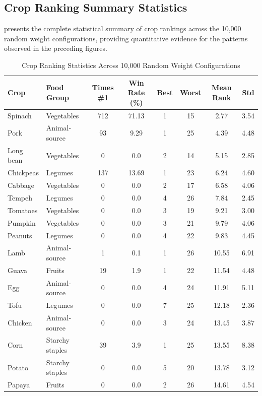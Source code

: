 \documentclass{oqireport}
\begin{document}
\subsection{Crop Ranking Summary Statistics}

 presents the complete statistical summary of crop rankings across the 10,000 random weight configurations, providing quantitative evidence for the patterns observed in the preceding figures.

\begin{table}[H]
\centering
\caption{Crop Ranking Statistics Across 10,000 Random Weight Configurations}
\label{tab:crop_ranking_summary}
\scriptsize
\begin{tabular}{llcccccc}
\toprule
\textbf{Crop} & \textbf{Food Group} & \textbf{Times \#1} & \textbf{Win Rate (\%)} & \textbf{Best} & \textbf{Worst} & \textbf{Mean Rank} & \textbf{Std} \\
\midrule
Spinach & Vegetables & 712 & 71.13 & 1 & 15 & 2.77 & 3.54 \\
Pork & Animal-source & 93 & 9.29 & 1 & 25 & 4.39 & 4.48 \\
Long bean & Vegetables & 0 & 0.0 & 2 & 14 & 5.15 & 2.85 \\
Chickpeas & Legumes & 137 & 13.69 & 1 & 23 & 6.24 & 4.60 \\
Cabbage & Vegetables & 0 & 0.0 & 2 & 17 & 6.58 & 4.06 \\
Tempeh & Legumes & 0 & 0.0 & 4 & 26 & 7.84 & 2.45 \\
Tomatoes & Vegetables & 0 & 0.0 & 3 & 19 & 9.21 & 3.00 \\
Pumpkin & Vegetables & 0 & 0.0 & 3 & 21 & 9.79 & 4.06 \\
Peanuts & Legumes & 0 & 0.0 & 4 & 22 & 9.83 & 4.45 \\
Lamb & Animal-source & 1 & 0.1 & 1 & 26 & 10.55 & 6.91 \\
Guava & Fruits & 19 & 1.9 & 1 & 22 & 11.54 & 4.48 \\
Egg & Animal-source & 0 & 0.0 & 4 & 24 & 11.91 & 5.11 \\
Tofu & Legumes & 0 & 0.0 & 7 & 25 & 12.18 & 2.36 \\
Chicken & Animal-source & 0 & 0.0 & 3 & 24 & 13.45 & 3.87 \\
Corn & Starchy staples & 39 & 3.9 & 1 & 25 & 13.55 & 8.38 \\
Potato & Starchy staples & 0 & 0.0 & 5 & 20 & 13.78 & 3.12 \\
Papaya & Fruits & 0 & 0.0 & 2 & 26 & 14.61 & 4.54 \\

\end{tabular}
\end{table}
\end{document}

